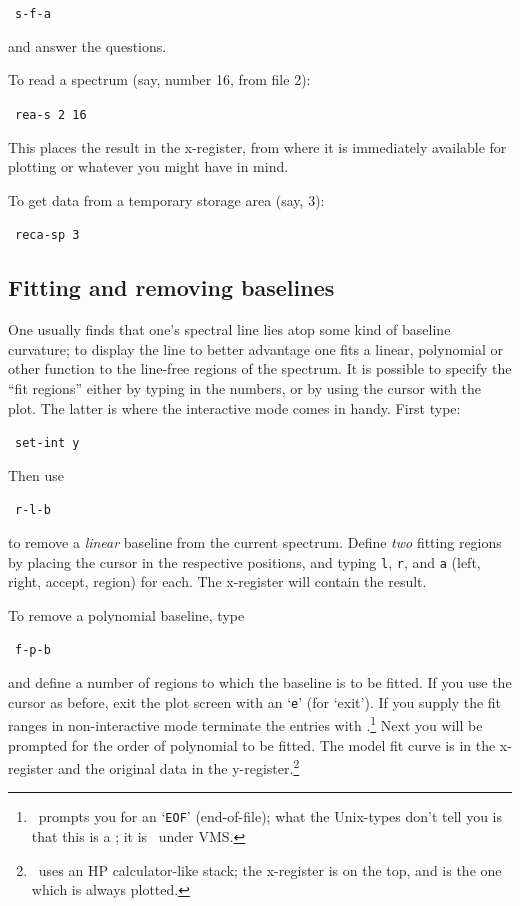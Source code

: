 \SP\ {\tt{s-f-a}}

and answer the questions.

To read a spectrum (say, number 16, from file 2):

\SP\ {\tt{rea-s 2 16}}

This places the result in the x-register, from where it is immediately 
available for plotting or whatever you might have in mind.

To get data from a temporary storage area (say, 3):

\SP\ {\tt{reca-sp 3}}

\subsection{Fitting and removing baselines}
\reversemarginpar
One usually finds that one's spectral line lies atop some kind of
baseline curvature; to display the line to better advantage one fits a
linear, polynomial or other function to the line-free regions of the
spectrum. It is possible to specify the ``fit regions'' either by
typing in the numbers, or by using the cursor with the plot.
The latter is where the interactive mode comes in handy. First type:

\SP\ {\tt{set-int y}}

Then use

\SP\ {\tt{r-l-b}} 

to remove a {\it{linear}} baseline from the current spectrum. Define
{\it{two}} fitting regions by placing the cursor in the respective
positions, and typing {\tt{l}}, {\tt{r}}, and {\tt{a}} (left, right,
accept, region) for each. The x-register will contain the result.

To remove a polynomial baseline, type

\SP\ {\tt{f-p-b}}

and define a number of regions to which the baseline is to be
fitted. If you use the cursor as before, exit the plot screen with an
`{\tt{e}}' (for `exit'). If you supply the fit ranges in
non-interactive mode terminate the entries with \ctrld 
.\footnote{\SPECX\ prompts you for an `{\tt{EOF}}' (end-of-file);
what the Unix-types don't tell you is that this is a \ctrld ; it is
\ctrlz\ under VMS.} Next you will be prompted for the order of polynomial to
be fitted. The model fit curve is in the x-register and the original
data in the y-register.\footnote{\SPECX\ uses an HP calculator-like
stack; the x-register is on the top, and is the one which is always
plotted.}

